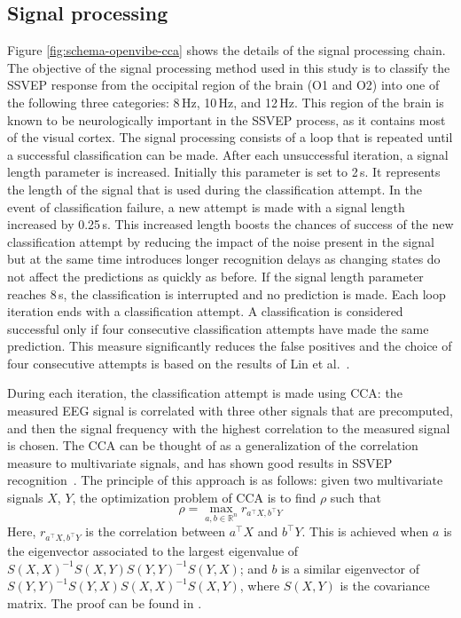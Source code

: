 \documentclass[smallextended]{svjour3}
\begin{document}
\subsection{Signal processing}

Figure \ref{fig:schema-openvibe-cca} shows the details of the signal processing chain.
The objective of the signal processing method used in this study is to classify the SSVEP response from the occipital region of the brain (O1 and O2) into one of the following three categories: 8\,Hz, 10\,Hz, and 12\,Hz.
This region of the brain is known to be neurologically important in the SSVEP process, as it contains most of the visual cortex.
The signal processing consists of a loop that is repeated until a successful classification can be made.
After each unsuccessful iteration, a signal length parameter is increased. Initially this parameter is set to 2\,s.
It represents the length of the signal that is used during the classification attempt.
In the event of classification failure, a new attempt is made with a signal length increased by 0.25\,s.
This increased length boosts the chances of success of the new classification attempt by reducing the impact of the noise present in the signal
but at the same time introduces longer recognition delays as changing states do not affect the predictions as quickly as before.
If the signal length parameter reaches 8\,s, the classification is interrupted and no prediction is made.
Each loop iteration ends with a classification attempt.
A classification is considered successful only if four consecutive classification attempts have made the same prediction. This measure significantly reduces the false positives and the choice of four consecutive attempts is based on the results of Lin et al.~\cite{Lin2014}.

During each iteration, the classification attempt is made using CCA: the measured EEG signal is correlated with three other signals that are precomputed, and then the signal frequency with the highest correlation to the measured signal is chosen.
The CCA can be thought of as a generalization of the correlation measure to multivariate signals, and has shown good results in SSVEP recognition~\cite{Lin2014}. The principle of this approach is as follows: given two multivariate signals $X$, $Y$, the optimization problem of CCA is to find $\rho$ such that
\\
\begin{equation}
\label{rho}
\rho = \max_{a, b \in \mathbb R^n} r_{ a^\top X, b^\top Y}
\end{equation}
Here, $r_{a^\top X, b^\top Y}$ is the correlation between $a^\top X$ and $b^\top Y$. This is achieved when $a$ is the eigenvector associated to the largest eigenvalue of $S(X, X)^{-1} S(X,Y) S(Y, Y)^{-1} S(Y, X)$; and $b$ is a similar eigenvector of $S(Y, Y)^{-1} S(Y, X) S(X, X)^{-1} S(X, Y)$, where $S(X, Y)$ is the covariance matrix. The proof can be found in \cite{rencher2003}.
\end{document}
